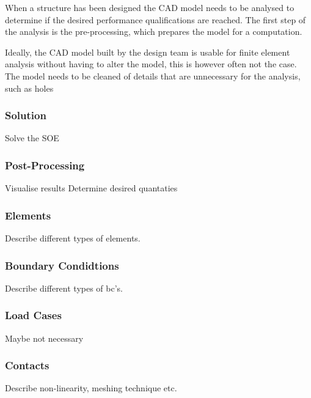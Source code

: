 When a structure has been designed the CAD model needs to be analysed to determine if the desired performance qualifications are reached. The first step of the analysis is the pre-processing, which prepares the model for a computation.

Ideally, the CAD model built by the design team is usable for finite element analysis without having to alter the model, this is however often not the case. 
The model needs to be cleaned of details that are unnecessary for the analysis, such as holes 

\subsubsection{Solution} %
\label{ssub:solution}
Solve the SOE

\subsubsection{Post-Processing} %
\label{ssub:post_processing}
Visualise results
Determine desired quantaties

\subsubsection{Elements} %
\label{ssub:elements}
Describe different types of elements.

\subsubsection{Boundary Condidtions} %
\label{ssub:boundary_condidtions}
Describe different types of bc's.

\subsubsection{Load Cases} %
\label{ssub:load_cases}
Maybe not necessary

\subsubsection{Contacts} %
\label{ssub:contacts}
Describe non-linearity, meshing technique etc.

